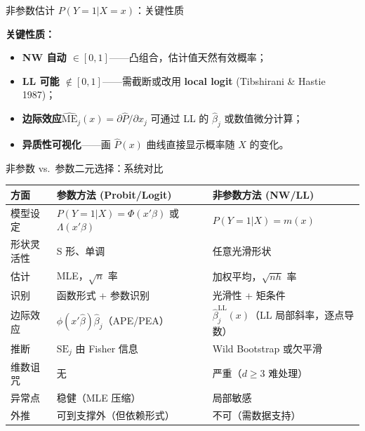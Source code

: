 \documentclass[aspectratio=169, 10pt]{beamer}
\renewcommand{\arraystretch}{1.05}
\begin{document}
\begin{frame}{非参数估计 $P(Y=1|X=x)$：关键性质}

  \begin{keybox}
    \textbf{关键性质：}
    \begin{itemize}
      \item \textbf{NW 自动 $\in [0,1]$}——凸组合，估计值天然有效概率；
      \item \textbf{LL 可能 $\notin [0,1]$}——需截断或改用 \textbf{local logit} (Tibshirani \& Hastie 1987)；
      \item \textbf{边际效应}$\hat{\text{ME}}_j(x) = \partial \hat P/\partial x_j$ 可通过 LL 的 $\hat\beta_j$ 或数值微分计算；
      \item \textbf{异质性可视化}——画 $\hat P(x)$ 曲线直接显示概率随 $X$ 的变化。
    \end{itemize}
  \end{keybox}

\end{frame}


\begin{frame}{非参数 vs.\ 参数二元选择：系统对比}
  \centering\small
  \renewcommand{\arraystretch}{1.25}
  \begin{tabular}{@{}p{3.0cm}p{4.8cm}p{4.8cm}@{}}
    \toprule
    \textbf{方面} & \textbf{参数方法 (Probit/Logit)} & \textbf{非参数方法 (NW/LL)} \\
    \midrule
    模型设定 & $P(Y=1|X)=\Phi(x'\beta)$ 或 $\Lambda(x'\beta)$ & $P(Y=1|X)=m(x)$ \\
    形状灵活性 & S 形、单调 & 任意光滑形状 \\
    估计 & MLE，$\sqrt{n}$ 率 & 加权平均，$\sqrt{nh}$ 率 \\
    识别 & 函数形式 + 参数识别 & 光滑性 + 矩条件 \\
    边际效应 & $\phi(x'\hat\beta)\hat\beta_j$（APE/PEA） & $\hat\beta_j^{\text{LL}}(x)$（LL 局部斜率，逐点导数） \\
    推断 & $\text{SE}_j$ 由 Fisher 信息 & Wild Bootstrap 或欠平滑 \\
    维数诅咒 & 无 & 严重（$d\geq 3$ 难处理） \\
    异常点 & 稳健（MLE 压缩） & 局部敏感 \\
    外推 & 可到支撑外（但依赖形式） & 不可（需数据支持） \\
    \bottomrule
  \end{tabular}

\end{frame}
\end{document}
